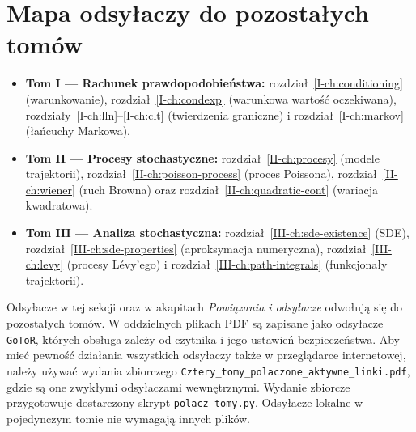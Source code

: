 \section*{Mapa odsyłaczy do pozostałych tomów}
\begin{itemize}
\item \textbf{Tom I — Rachunek prawdopodobieństwa:} rozdział~\ref{I-ch:conditioning} (warunkowanie), rozdział~\ref{I-ch:condexp} (warunkowa wartość oczekiwana), rozdziały~\ref{I-ch:lln}--\ref{I-ch:clt} (twierdzenia graniczne) i rozdział~\ref{I-ch:markov} (łańcuchy Markowa).
\item \textbf{Tom II — Procesy stochastyczne:} rozdział~\ref{II-ch:procesy} (modele trajektorii), rozdział~\ref{II-ch:poisson-process} (proces Poissona), rozdział~\ref{II-ch:wiener} (ruch Browna) oraz rozdział~\ref{II-ch:quadratic-cont} (wariacja kwadratowa).
\item \textbf{Tom III — Analiza stochastyczna:} rozdział~\ref{III-ch:sde-existence} (SDE), rozdział~\ref{III-ch:sde-properties} (aproksymacja numeryczna), rozdział~\ref{III-ch:levy} (procesy Lévy'ego) i rozdział~\ref{III-ch:path-integrals} (funkcjonały trajektorii).
\end{itemize}
Odsyłacze w tej sekcji oraz w akapitach \emph{Powiązania i odsyłacze} odwołują się do pozostałych tomów. W oddzielnych plikach PDF są zapisane jako odsyłacze \texttt{GoToR}, których obsługa zależy od czytnika i jego ustawień bezpieczeństwa. Aby mieć pewność działania wszystkich odsyłaczy także w przeglądarce internetowej, należy używać wydania zbiorczego \texttt{Cztery\_tomy\_polaczone\_aktywne\_linki.pdf}, gdzie są one zwykłymi odsyłaczami wewnętrznymi. Wydanie zbiorcze przygotowuje dostarczony skrypt \texttt{polacz\_tomy.py}. Odsyłacze lokalne w pojedynczym tomie nie wymagają innych plików.

